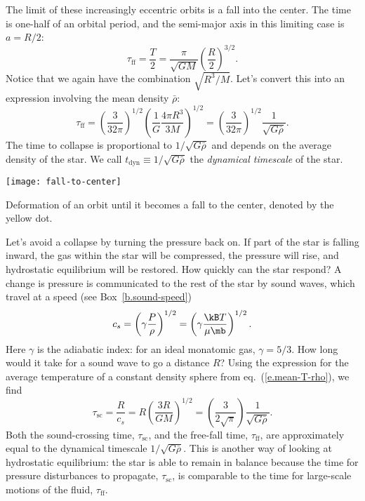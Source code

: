 The limit of these increasingly eccentric orbits is a fall into the center.  The time is one-half of an orbital period, and the semi-major axis in this limiting case is $a = R/2$:
\[
\tau_{\mathrm{ff}} = \frac{T}{2} = \frac{\pi}{\sqrt{GM}} \left(\frac{R}{2}\right)^{3/2}.
\]
Notice that we again have the combination $\sqrt{R^{3}/M}$.  Let's convert this into an expression involving the mean density $\bar{\rho}$:
\begin{equation}\label{e.tff}
\tau_{\mathrm{ff}} = \left(\frac{3}{32\pi}\right)^{1/2}\left(\frac{1}{G}\frac{4\pi R^{3}}{3M}\right)^{1/2} = \left(\frac{3}{32\pi}\right)^{1/2} \frac{1}{\sqrt{G\bar{\rho}}}.
\end{equation}
The time to collapse is proportional to $1/\sqrt{G\bar{\rho}}$ and depends on the average density of the star. We call $t_{\mathrm{dyn}} \equiv 1/\sqrt{G\bar{\rho}}$ the \emph{dynamical timescale} of the star.

\begin{marginfigure}
\texttt{[image: fall-to-center]}
\caption[Fall to center]{\label{f.fall-to-center} Deformation of an orbit until it becomes a fall to the center, denoted by the yellow dot.}
\end{marginfigure}

Let's avoid a collapse by turning the pressure back on.  If part of the star is falling inward, the gas within the star will be compressed, the pressure will rise, and hydrostatic equilibrium will be restored.  How quickly can the star respond? A change is pressure is communicated to the rest of the star by sound waves, which travel at a speed (see Box~\ref{b.sound-speed})
\begin{equation}\label{e.speed-of-sound}
c_{s} = \left(\gamma\frac{P}{\rho}\right)^{1/2}
	= \left(\gamma\frac{\kB T}{\mu\mb}\right)^{1/2}.
\end{equation}
Here $\gamma$ is the adiabatic index: for an ideal monatomic gas, $\gamma = 5/3$.  How long would it take for a sound wave to go a distance $R$?  Using the expression for the average temperature of a constant density sphere from eq.~(\ref{e.mean-T-rho}), we find
\[
	\tau_{\mathrm{sc}} = \frac{R}{c_{s}} = R\left(\frac{3R}{GM}\right)^{1/2}
		= \left(\frac{3}{2\sqrt{\pi}}\right)\frac{1}{\sqrt{G\bar{\rho}}}.
\]
Both the sound-crossing time, $\tau_{\mathrm{sc}}$, and the free-fall time, $\tau_{\mathrm{ff}}$, are approximately equal to the dynamical timescale $1/\sqrt{G\bar{\rho}}$.  This is another way of looking at hydrostatic equilibrium: the star is able to remain in balance because the time for pressure disturbances to propagate, $\tau_{\mathrm{sc}}$, is comparable to the time for large-scale motions of the fluid, $\tau_{\mathrm{ff}}$.

